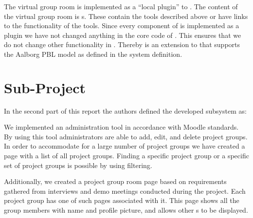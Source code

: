 
The virtual group room is implemented as a ``local plugin'' to \moodle{}.
The content of the virtual group room is \block{}s.
These contain the tools described above or have links to the functionality of the tools.
Since every component of \system{} is implemented as a \moodle{} plugin we have not changed anything in the core code of \moodle{}.
This ensures that we do not change other functionality in \moodle{}.
Thereby \system{} is an extension to \moodle{} that supports the Aalborg PBL model as defined in the system definition.

\section{Sub-Project}
\label{sec:subconclusion}


In the second part of this report the authors defined the developed subsystem as:





We implemented an administration tool in accordance with Moodle standards.
By using this tool administrators are able to add, edit, and delete project groups.
In order to accommodate for a large number of project groups we have created a page with a list of all project groups.
Finding a specific project group or a specific set of project groups is possible by using filtering.

Additionally, we created a project group room page based on requirements gathered from interviews and demo meetings conducted during the project.
Each project group has one of such pages associated with it.
This page shows all the group members with name and profile picture, and allows other \block{}s to be displayed.

